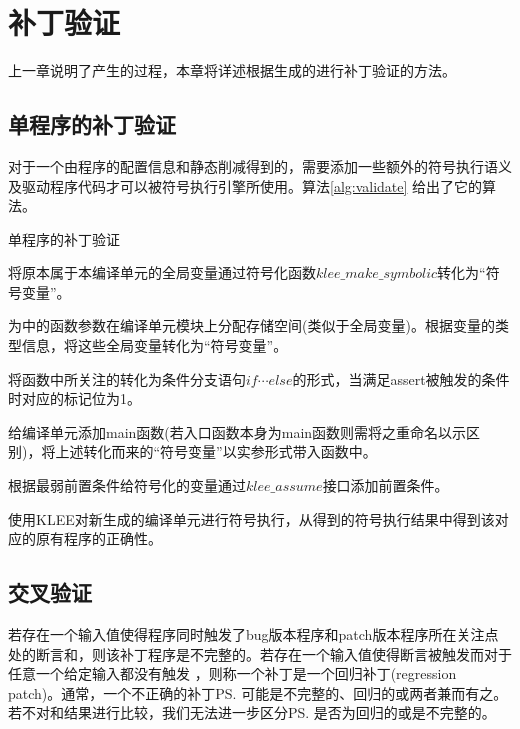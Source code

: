 \chapter{补丁验证}
\label{chap:linker}

上一章说明了产生\rbscope 的过程，本章将详述根据生成的\rbscope 进行补丁验证的方法。

\section{单程序的补丁验证}
\label{sec:validate}
对于一个由程序的配置信息和静态削减得到的\rbscope ，需要添加一些额外的符号执行语义及驱动程序代码才可以被符号执行引擎所使用。算法\ref{alg:validate} 给出了它的算法。
\begin{algorithm}\label{alg:validate}
\caption{单程序的补丁验证}
\SetAlgoNoLine

将原本属于本编译单元的全局变量通过符号化函数$klee\_make\_symbolic$转化为“符号变量”。

为\prog\entry 中的函数参数在编译单元模块上分配存储空间(类似于全局变量)。根据变量的类型信息，将这些全局变量转化为“符号变量”。

将函数中所关注的\prog\ass 转化为条件分支语句$if\cdots else$的形式，当满足assert被触发的条件时对应的标记位为1。

给编译单元添加main函数(若入口函数本身为main函数则需将之重命名以示区别)，将上述转化而来的“符号变量”以实参形式带入函数中。

根据最弱前置条件给符号化的变量通过$klee\_assume$接口添加前置条件。

使用KLEE对新生成的编译单元进行符号执行，从得到的符号执行结果中得到该\rbscope 对应的原有程序的正确性。
\end{algorithm}

\section{交叉验证}
\label{sec:cross}

若存在一个输入值使得程序同时触发了bug版本程序\bug 和patch版本程序\patch 所在关注点处的断言\bug\ass 和\patch\ass，则该补丁程序是不完整的。若存在一个输入值使得断言\patch\ass 被触发而对于任意一个给定输入\pin 都没有触发 \bug\ass ，则称一个补丁是一个回归补丁(regression patch)。通常，一个不正确的补丁\patch\ps 可能是不完整的、回归的或两者兼而有之。若不对\bug 和\patch 结果进行比较，我们无法进一步区分\patch\ps 是否为回归的或是不完整的。

